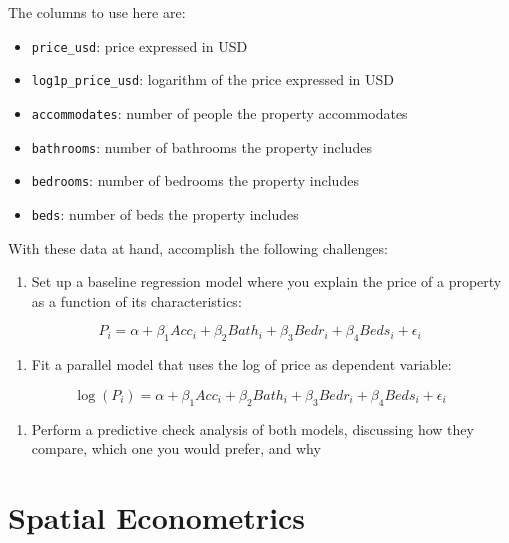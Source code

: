 \documentclass[
]{book}
\providecommand{\tightlist}{%
  \setlength{\itemsep}{0pt}\setlength{\parskip}{0pt}}
\begin{document}
The columns to use here are:

\begin{itemize}
\tightlist
\item
  \texttt{price\_usd}: price expressed in USD
\item
  \texttt{log1p\_price\_usd}: logarithm of the price expressed in USD
\item
  \texttt{accommodates}: number of people the property accommodates
\item
  \texttt{bathrooms}: number of bathrooms the property includes
\item
  \texttt{bedrooms}: number of bedrooms the property includes
\item
  \texttt{beds}: number of beds the property includes
\end{itemize}

With these data at hand, accomplish the following challenges:

\begin{enumerate}
\def\labelenumi{\arabic{enumi}.}
\tightlist
\item
  Set up a baseline regression model where you explain the price of a property as a function of its characteristics:
\end{enumerate}

\[
P_i = \alpha + \beta_1 Acc_i + \beta_2 Bath_i + \beta_3 Bedr_i + \beta_4 Beds_i + \epsilon_i
\]

\begin{enumerate}
\def\labelenumi{\arabic{enumi}.}
\setcounter{enumi}{1}
\tightlist
\item
  Fit a parallel model that uses the log of price as dependent variable:
\end{enumerate}

\[
\log(P_i) = \alpha + \beta_1 Acc_i + \beta_2 Bath_i + \beta_3 Bedr_i + \beta_4 Beds_i + \epsilon_i
\]

\begin{enumerate}
\def\labelenumi{\arabic{enumi}.}
\setcounter{enumi}{2}
\tightlist
\item
  Perform a predictive check analysis of both models, discussing how they compare, which one you would prefer, and why
\end{enumerate}

\hypertarget{spatialecon}{%
\chapter{Spatial Econometrics}\label{spatialecon}}
\end{document}

